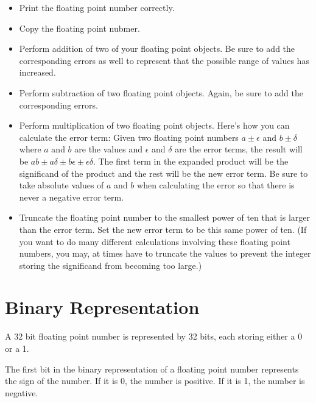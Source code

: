 \begin{problem}
\begin{itemize}
\begin{itemize}
	\item Print the floating point number correctly.

	\item Copy the floating point nubmer.

	\item Perform addition of two of your floating point objects.
		Be sure to add the corresponding errors as well to represent that the possible range of values has increased.

	\item Perform subtraction of two floating point objects.
		Again, be sure to add the corresponding errors.

	\item Perform multiplication of two floating point objects.
		Here's how you can calculate the error term:
		Given two floating point numbers $a\pm\epsilon$ and $b\pm\delta$ where $a$ and $b$ are the values and $\epsilon$ and $\delta$ are the error terms, the result will be $ab \pm a\delta \pm b\epsilon \pm \epsilon\delta$.
		The first term in the expanded product will be the significand of the product and the rest will be the new error term.
		Be sure to take absolute values of $a$ and $b$ when calculating the error so that there is never a negative error term.

	\item Truncate the floating point number to the smallest power of ten that is larger than the error term.
		Set the new error term to be this same power of ten.
		(If you want to do many different calculations involving these floating point numbers, you may, at times have to truncate the values to prevent the integer storing the significand from becoming too large.)

	\end{itemize}

\end{itemize}
\end{problem}

\section*{Binary Representation}

A 32 bit floating point number is represented by 32 bits, each storing either a 0 or a 1.

The first bit in the binary representation of a floating point number represents the sign of the number.
If it is 0, the number is positive.
If it is 1, the number is negative.

